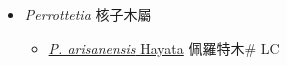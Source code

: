 
  \begin{itemize}
 \item[] \textit{Perrottetia} 核子木屬
                    
  \begin{itemize}
        \item[] \href{http://www.theplantlist.org/tpl1.1/search?q=Perrottetia+arisanensis}{\textit{P. arisanensis} Hayata}   佩羅特木\# LC
  \end{itemize}
  \end{itemize}
